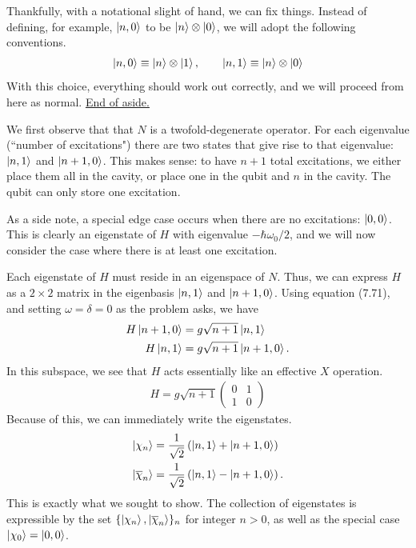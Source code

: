 \documentclass{book}
\begin{document}
    Thankfully, with a notational slight of hand, we can fix things. Instead of defining, for example, $\ket{n,0}$ to be $\ket{n}\otimes \ket{0}$, we will adopt the following conventions.
    \begin{align}
        \ket{n,0} \equiv \ket{n}\otimes \ket{1}, \qquad \ket{n,1} \equiv \ket{n}\otimes \ket{0}
    \end{align}
    With this choice, everything should work out correctly, and we will proceed from here as normal. \underline{End of aside.}

    We first observe that that $N$ is a twofold-degenerate operator. For each eigenvalue (``number of excitations") there are two states that give rise to that eigenvalue: $\ket{n, 1}$ and $\ket{n + 1, 0}$. This makes sense: to have $n+1$ total excitations, we either place them all in the cavity, or place one in the qubit and $n$ in the cavity. The qubit can only store one excitation.

    As a side note, a special edge case occurs when there are no excitations: $\ket{0,0}$. This is clearly an eigenstate of $H$ with eigenvalue $-\hbar \omega_0/2$, and we will now consider the case where there is at least one excitation.

    Each eigenstate of $H$ must reside in an eigenspace of $N$. Thus, we can express $H$ as a $2\times 2$ matrix in the eigenbasis $\ket{n, 1}$ and $\ket{n + 1, 0}$. Using equation (7.71), and setting $\omega = \delta = 0$ as the problem asks, we have
    \begin{align}
    \begin{aligned}
        H \ket{n+1,0} &= g \sqrt{n+1} \ket{n, 1} \\
        H\ket{n,1} &= g \sqrt{n+1} \ket{n+1, 0}.
    \end{aligned}
    \end{align}
    In this subspace, we see that $H$ acts essentially like an effective $X$ operation.
    \begin{align}
        H = g\sqrt{n+1}\begin{pmatrix}
            0 & 1 \\
            1 & 0
        \end{pmatrix}
    \end{align}
    Because of this, we can immediately write the eigenstates. 
    \begin{align}
    \begin{aligned}
        \ket{\chi_n} &= \frac{1}{\sqrt{2}}\left(\ket{n, 1} + \ket{n+1,0}\right) \\
        \ket{\overline{\chi}_n} &= \frac{1}{\sqrt{2}}\left(\ket{n, 1} - \ket{n+1,0}\right).
    \end{aligned}
    \end{align}
    This is exactly what we sought to show. The collection of eigenstates is expressible by the set $\{\ket{\chi_n}, \ket{\overline{\chi}_n}\}_n$ for integer $n > 0$, as well as the special case $\ket{\chi_0} = \ket{0,0}$.
\end{document}
